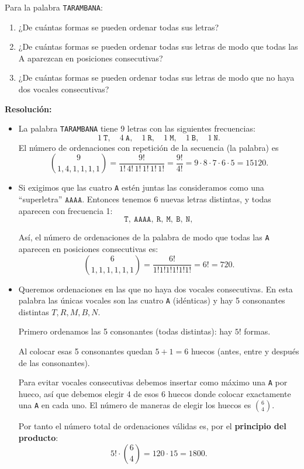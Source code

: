 \documentclass[a4paper,12pt]{article}
\begin{document}
\begin{ejercicio}[title=Ejercicio 48]
Para la palabra \texttt{TARAMBANA}:

\begin{enumerate}
\item[a)] ¿De cuántas formas se pueden ordenar todas sus letras?
\item[b)] ¿De cuántas formas se pueden ordenar todas sus letras de modo que todas las A aparezcan en posiciones consecutivas?
\item[c)] ¿De cuántas formas se pueden ordenar todas sus letras de modo que no haya dos vocales consecutivas?
\end{enumerate}

\tcblower
\textbf{Resolución:}

\begin{itemize}
\item[a)] La palabra \texttt{TARAMBANA} tiene 9 letras con las siguientes frecuencias:
\[
1\ \texttt{T},\quad 4\ \texttt{A},\quad 1\ \texttt{R},\quad 1\ \texttt{M},\quad 1\ \texttt{B},\quad 1\ \texttt{N}.
\]
El número de ordenaciones con repetición de la secuencia (la palabra) es
\[
\binom{9}{1,4,1,1,1,1} =\frac{9!}{1!\,4!\,1!\,1!\,1!\,1!}=\frac{9!}{4!}=9\cdot8\cdot7\cdot6\cdot5=\boxed{15120}.
\]

\item[b)] Si exigimos que las cuatro \texttt{A} estén juntas las consideramos como una ``superletra'' \(\texttt{AAAA}\). Entonces tenemos 6 nuevas letras distintas, y todas aparecen con frecuencia 1:
\[
\texttt{T},\ \texttt{AAAA},\ \texttt{R},\ \texttt{M},\ \texttt{B},\ \texttt{N},
\]

Así, el número de ordenaciones de la palabra de modo que todas las \texttt{A} aparecen en posiciones consecutivas es:
\[
\binom{6}{1,1,1,1,1,1} = \frac{6!}{1!1!1!1!1!1!} = 6! = \boxed{720}.
\]

\item[c)] Queremos ordenaciones en las que no haya dos vocales consecutivas. En esta palabra las únicas vocales son las cuatro \texttt{A} (idénticas) y hay 5 consonantes distintas \(T,R,M,B,N\).

Primero ordenamos las 5 consonantes (todas distintas): hay \(5!\) formas.

Al colocar esas 5 consonantes quedan \(5+1=6\) huecos (antes, entre y después de las consonantes).

Para evitar vocales consecutivas debemos insertar como máximo una \texttt{A} por hueco, así que debemos elegir 4 de esos 6 huecos donde colocar exactamente una \texttt{A} en cada uno. El número de maneras de elegir los huecos es \(\binom{6}{4}\).

Por tanto el número total de ordenaciones válidas es, por el \textbf{principio del producto}:
\[
5! \cdot \binom{6}{4} = 120 \cdot 15 = \boxed{1800}.
\]
\end{itemize}

\end{ejercicio}
\end{document}
